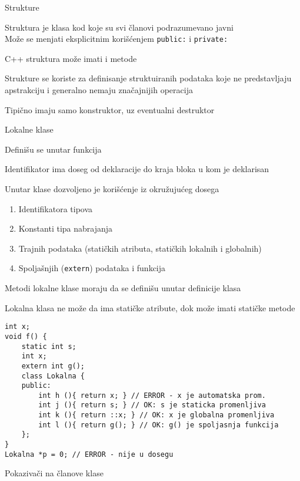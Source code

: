 \documentclass{article}
\newenvironment{xitemize}{%
    
    \itemize
    \larger
}{%
    \enditemize
}
\let\olditemize\itemize
\let\endolditemize\enditemize
\renewenvironment{itemize}{%
    \smaller
    \olditemize
}{%
    \endolditemize
}
\providecommand{\inlinecode}[1]{\texttt{#1}}
\begin{document}
\begin{xitemize}
\item Strukture
\begin{itemize}
    \item Struktura je klasa kod koje su svi članovi podrazumevano javni\\
    Može se menjati eksplicitnim korišćenjem \inlinecode{public:} i \inlinecode{private:}
    \item C++ struktura može imati i metode
    \item Strukture se koriste za definisanje struktuiranih podataka koje ne predstavljaju apstrakciju i generalno nemaju značajnijih operacija
    \item Tipično imaju samo konstruktor, uz eventualni destruktor
\end{itemize}
\item Lokalne klase 
\begin{itemize}
    \item Definišu se unutar funkcija
    \item Identifikator ima doseg od deklaracije do kraja bloka u kom je deklarisan
    \item Unutar klase dozvoljeno je korišćenje iz okružujućeg dosega
    \begin{enumerate}
        \item Identifikatora tipova
        \item Konstanti tipa nabrajanja
        \item Trajnih podataka (statičkih atributa, statičkih lokalnih i globalnih)
        \item Spoljašnjih (\inlinecode{extern}) podataka i funkcija
    \end{enumerate}
    \item Metodi lokalne klase moraju da se definišu unutar definicije klasa
    \item Lokalna klasa ne može da ima statičke atribute, dok može imati statičke metode
    \begin{lstlisting}
int x;
void f() {
    static int s;
    int x;
    extern int g();
    class Lokalna {
    public:
        int h (){ return x; } // ERROR - x je automatska prom.
        int j (){ return s; } // OK: s je staticka promenljiva
        int k (){ return ::x; } // OK: x je globalna promenljiva
        int l (){ return g(); } // OK: g() je spoljasnja funkcija
    };
}
Lokalna *p = 0; // ERROR - nije u dosegu
    \end{lstlisting}
\end{itemize}
\item Pokazivači na članove klase

\end{xitemize}
\end{document}
